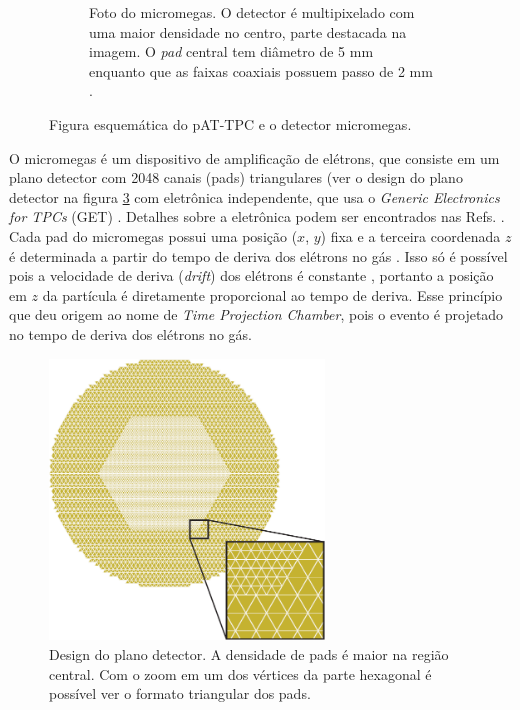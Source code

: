 \documentclass[a4paper,12pt,oneside]{book}
\begin{document}
\begin{figure}[H]
\begin{subfigure}[t]{0.49\textwidth}
        \caption{Foto do micromegas. O detector é multipixelado com uma maior densidade no centro, parte destacada na imagem. O \textit{pad} central tem diâmetro de 5 mm enquanto que as faixas coaxiais possuem passo de 2 mm \cite{attpc, josh_bradt}.}
        \label{subfig:micromegas} 
    \end{subfigure}
\caption{Figura esquemática do pAT-TPC e o detector micromegas\cite{pattpc}.}
\label{fig:pattpc_e_micromegas}
\end{figure}

\par O micromegas é um dispositivo de amplificação de elétrons, que consiste em um plano detector com 2048 canais (pads) triangulares (ver o design do plano detector na figura \ref{fig:padplane} com eletrônica independente, que usa o \textit{Generic Electronics for TPCs} (GET) \cite{GET}. Detalhes sobre a eletrônica podem ser encontrados nas Refs. \cite{GET, josh_bradt}. Cada pad do micromegas possui uma posição ($x$, $y$) fixa e a terceira coordenada $z$ é determinada a partir do tempo de deriva dos elétrons no gás \cite{pattpc, pattpc2, attpc, josh_bradt}. Isso só é possível pois a velocidade de deriva (\textit{drift}) dos elétrons é constante \cite{drift_constant}, portanto a posição em $z$ da partícula é diretamente proporcional ao tempo de deriva. Esse princípio que deu origem ao nome de \textit{Time Projection Chamber}, pois o evento é projetado no tempo de deriva dos elétrons no gás.

\begin{figure}[H]
    \centering
    \includegraphics[width=0.65\textwidth]{figs/padplane.png}
    \caption{Design do plano detector. A densidade de pads é maior na região central. Com o zoom em um dos vértices da parte hexagonal é possível ver o formato triangular dos pads.}
    \label{fig:padplane}
\end{figure}
\end{document}
